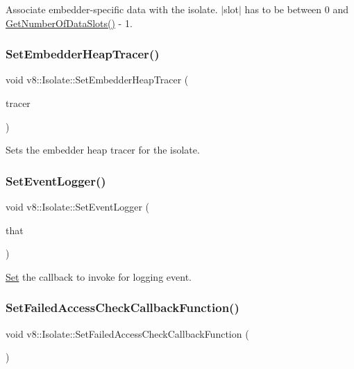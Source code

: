 Associate embedder-\/specific data with the isolate. $\vert$slot$\vert$ has to be between 0 and \mbox{\hyperlink{classv8_1_1Isolate_a7060092fd45588f4085753b3da1b2c82}{Get\+Number\+Of\+Data\+Slots()}} -\/ 1. \mbox{\label{classv8_1_1Isolate_a33569984c556a90ae380f96aa7a82fad}} 
\subsubsection{\texorpdfstring{Set\+Embedder\+Heap\+Tracer()}{SetEmbedderHeapTracer()}}
{\footnotesize\ttfamily void v8\+::\+Isolate\+::\+Set\+Embedder\+Heap\+Tracer (\begin{DoxyParamCaption}\item[{\mbox{\hyperlink{classv8_1_1EmbedderHeapTracer}{Embedder\+Heap\+Tracer}} $\ast$}]{tracer }\end{DoxyParamCaption})}

Sets the embedder heap tracer for the isolate. \mbox{\label{classv8_1_1Isolate_a28bf18f2f6ed468ec97f59df682e73c1}} 
\subsubsection{\texorpdfstring{Set\+Event\+Logger()}{SetEventLogger()}}
{\footnotesize\ttfamily void v8\+::\+Isolate\+::\+Set\+Event\+Logger (\begin{DoxyParamCaption}\item[{Log\+Event\+Callback}]{that }\end{DoxyParamCaption})}

\mbox{\hyperlink{classv8_1_1Set}{Set}} the callback to invoke for logging event. \mbox{\label{classv8_1_1Isolate_ab9ef29fc049d82e0c33994632b4f6ba6}} 
\subsubsection{\texorpdfstring{Set\+Failed\+Access\+Check\+Callback\+Function()}{SetFailedAccessCheckCallbackFunction()}}
{\footnotesize\ttfamily void v8\+::\+Isolate\+::\+Set\+Failed\+Access\+Check\+Callback\+Function (\begin{DoxyParamCaption}\item[{Failed\+Access\+Check\+Callback}]{ }\end{DoxyParamCaption})}

